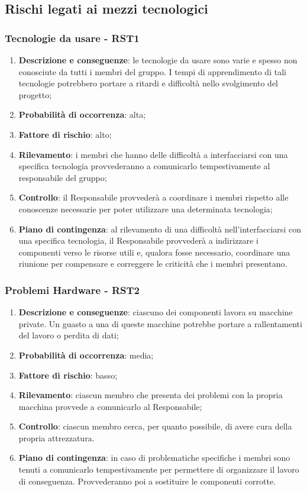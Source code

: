 \subsection{Rischi legati ai mezzi tecnologici}
	\subsubsection{Tecnologie da usare - RST1}		
	\begin{enumerate}
		\item \textbf{Descrizione e conseguenze}: le tecnologie da usare sono varie e spesso non conosciute da tutti i membri del gruppo. I tempi di apprendimento di tali tecnologie potrebbero portare a ritardi e difficoltà nello svolgimento del progetto;
		\item \textbf{Probabilità di occorrenza}: alta;
		\item \textbf{Fattore di rischio}: alto;
		\item \textbf{Rilevamento}: i membri che hanno delle difficoltà a interfacciarsi con una specifica tecnologia provvederanno a comunicarlo tempestivamente al responsabile del gruppo;
		\item \textbf{Controllo}: il Responsabile provvederà a coordinare i membri rispetto alle conoscenze necessarie per poter utilizzare una determinata tecnologia;  
		\item \textbf{Piano di contingenza}: al rilevamento di una difficoltà nell'interfacciarsi con una specifica tecnologia, il Responsabile provvederà a indirizzare i componenti verso le risorse utili e, qualora fosse necessario, coordinare una riunione per compensare e correggere le criticità che i membri presentano.
	\end{enumerate}	
	
	\subsubsection{Problemi Hardware - RST2}
	\begin{enumerate}
		\item \textbf{Descrizione e conseguenze}: ciascuno dei componenti lavora su macchine private. Un guasto a una di queste macchine potrebbe portare a rallentamenti del lavoro o perdita di dati;
		\item \textbf{Probabilità di occorrenza}: media;
		\item \textbf{Fattore di rischio}: basso;
		\item \textbf{Rilevamento}: ciascun membro che presenta dei problemi con la propria macchina provvede a comunicarlo al Responsabile;		
		\item \textbf{Controllo}: ciascun membro cerca, per quanto possibile, di avere cura della propria attrezzatura.
		\item \textbf{Piano di contingenza}: in caso di problematiche specifiche i membri sono tenuti a comunicarlo tempestivamente per permettere di organizzare il lavoro di conseguenza. Provvederanno poi a sostituire le componenti corrotte. 
	\end{enumerate}
	
